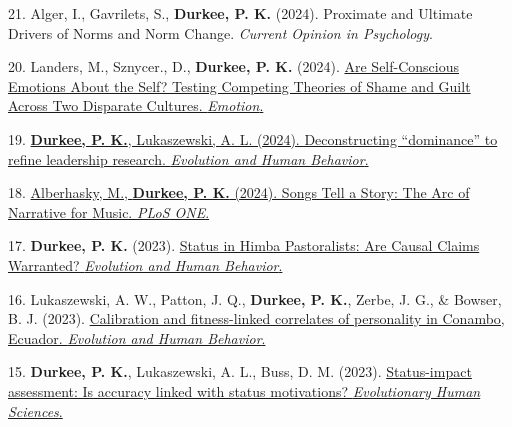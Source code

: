 \documentclass[10pt,]{article}
\begin{document}
21.\hangindent=0.5in \marginpar{\scriptsize{\faLightbulbO\faPencil}}
Alger, I., Gavrilets, S., \textbf{Durkee, P. K.} (2024). Proximate and
Ultimate Drivers of Norms and Norm Change. \emph{Current Opinion in
Psychology}.

20.\hangindent=0.5in
\marginpar{\scriptsize{\faLightbulbO\faBarChart\faPencil}}
\marginpar{\textsuperscript{\faCheckCircle \faDatabase \faFileCodeO}}
Landers, M., Sznycer., D., \textbf{Durkee, P. K.} (2024).
\href{http://www.pdurkee.com/files/pubs/LandersSznycerDurkee2024.pdf}{Are
Self-Conscious Emotions About the Self? Testing Competing Theories of
Shame and Guilt Across Two Disparate Cultures. \emph{Emotion}.}

19.\hangindent=0.5in \marginpar{\scriptsize{\faLightbulbO\faPencil}}
\href{https://www.sciencedirect.com/science/article/pii/S1090513824000461?dgcid=author}{\textbf{Durkee,
P. K.}, Lukaszewski, A. L. (2024). Deconstructing ``dominance'' to
refine leadership research. \emph{Evolution and Human Behavior}.}

18.\hangindent=0.5in
\marginpar{\scriptsize{\faLightbulbO\faBarChart\faPencil\faFileCodeO}}
\href{https://journals.plos.org/plosone/article?id=10.1371/journal.pone.0303188}{Alberhasky,
M., \textbf{Durkee, P. K.} (2024). Songs Tell a Story: The Arc of
Narrative for Music. \emph{PLoS ONE}.}

17.\hangindent=0.5in \marginpar{\scriptsize{\faLightbulbO\faPencil}}
\textbf{Durkee, P. K.} (2023).
\href{http://www.pdurkee.com/files/pubs/Durkee2023_HimbaStatusComment.pdf}{Status
in Himba Pastoralists: Are Causal Claims Warranted? \emph{Evolution and
Human Behavior}.}

16.\hangindent=0.5in \marginpar{\scriptsize{\faBarChart\faPencil}}
\marginpar{\textsuperscript{\faDatabase\faFileCodeO}} Lukaszewski, A.
W., Patton, J. Q., \textbf{Durkee, P. K.}, Zerbe, J. G., \& Bowser, B.
J. (2023).
\href{http://www.pdurkee.com/files/pubs/PersonalityConambo2023.pdf}{Calibration
and fitness-linked correlates of personality in Conambo, Ecuador.
\emph{Evolution and Human Behavior}.}

15.\hangindent=0.5in
\marginpar{\scriptsize{\faLightbulbO\faTable\faBarChart\faPencil}}
\marginpar{\textsuperscript{\faRegistered\faDatabase\faFileCodeO}}
\textbf{Durkee, P. K.}, Lukaszewski, A. L., Buss, D. M. (2023).
\href{https://www.cambridge.org/core/services/aop-cambridge-core/content/view/F16454C7E058347A01F94E64565CBF19/S2513843X23000129a.pdf/status-impact-assessment-is-accuracy-linked-with-status-motivations.pdf}{Status-impact
assessment: Is accuracy linked with status motivations?
\emph{Evolutionary Human Sciences}.}
\end{document}
